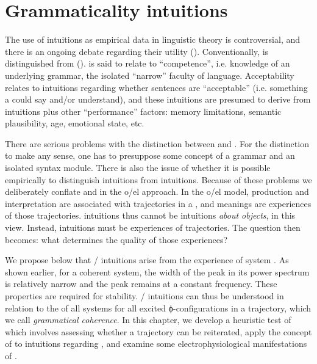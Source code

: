 \chapter{Grammaticality intuitions}

The use of  intuitions as empirical data in linguistic theory is controversial, and there is an ongoing debate regarding their utility (\citealt{CulicoverJackendoff2010,FFerreira2005,GibsonFedorenko2010,GibsonFedorenko2013,SprouseAlmeida2013}). Conventionally,  is distinguished from  (\citealt{Schütze2016,Sprouse2007}).  is said to relate to “competence”, i.e. knowledge of an underlying grammar, the isolated “narrow” faculty of language. Acceptability relates to intuitions regarding whether sentences are “acceptable” (i.e. something a  could say and/or understand), and these intuitions are presumed to derive from  intuitions plus other “performance” factors: memory limitations, semantic plausibility,  age, emotional state, etc. 

  There are serious problems with the distinction between  and . For the distinction to make any sense, one has to presuppose some concept of a grammar and an isolated syntax module. There is also the issue of whether it is possible empirically to distinguish  intuitions from  intuitions. Because of these problems we deliberately conflate  and  in the o/el approach. In the o/el model, production and interpretation are associated with trajectories in a , and meanings are experiences of those trajectories.  intuitions thus cannot be intuitions \textit{about objects}, in this view. Instead,  intuitions must be experiences of trajectories. The question then becomes: what determines the quality of those experiences? 

  We propose below that / intuitions arise from the experience of system . As shown earlier, for a coherent system, the width of the peak in its power spectrum is relatively narrow and the peak remains at a constant frequency. These properties are required for stability. / intuitions can thus be understood in relation to the  of all systems for all excited ϕ-con\-fi\-gu\-ra\-tions in a trajectory, which we call \textit{grammatical coherence}. In this chapter, we develop a heuristic test of  which involves assessing whether a trajectory can be reiterated, apply the concept of  to intuitions regarding , and examine some electrophysiological manifestations of . 


